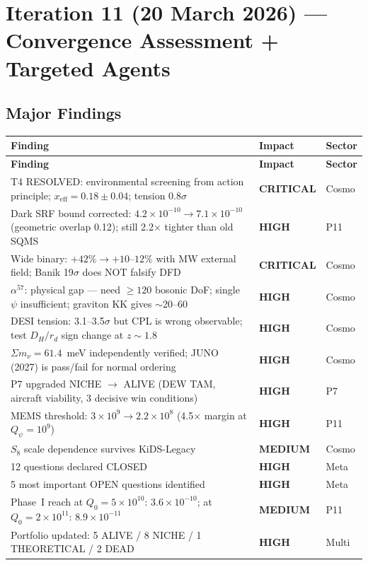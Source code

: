 \documentclass[11pt,a4paper]{article}
\newcommand{\CRITICAL}{\textcolor{critical}{\textbf{CRITICAL}}}
\newcommand{\HIGH}{\textcolor{high}{\textbf{HIGH}}}
\newcommand{\MEDIUM}{\textcolor{medium}{\textbf{MEDIUM}}}
\begin{document}
\section{Iteration 11 (20 March 2026) --- Convergence Assessment + Targeted Agents}

\subsection{Major Findings}

\begin{longtable}{p{}p{}p{}}
\toprule
\textbf{Finding} & \textbf{Impact} & \textbf{Sector} \\
\midrule
\endfirsthead
\midrule
\textbf{Finding} & \textbf{Impact} & \textbf{Sector} \\
\midrule
\endhead
T4 RESOLVED: environmental screening from action principle; $x_\mathrm{eff}=0.18\pm0.04$; tension 0.8$\sigma$ & \CRITICAL & Cosmo \\
Dark SRF bound corrected: $4.2\times10^{-10}\to7.1\times10^{-10}$ (geometric overlap 0.12); still 2.2$\times$ tighter than old SQMS & \HIGH & P11 \\
Wide binary: $+42\%\to+10$--$12\%$ with MW external field; Banik 19$\sigma$ does NOT falsify DFD & \CRITICAL & Cosmo \\
$\alpha^{57}$: physical gap --- need $\geq120$ bosonic DoF; single $\psi$ insufficient; graviton KK gives $\sim$20--60 & \HIGH & Cosmo \\
DESI tension: 3.1--3.5$\sigma$ but CPL is wrong observable; test $D_H/r_d$ sign change at $z\sim1.8$ & \HIGH & Cosmo \\
$\Sigma m_\nu = 61.4$~meV independently verified; JUNO (2027) is pass/fail for normal ordering & \HIGH & Cosmo \\
P7 upgraded NICHE $\to$ ALIVE (DEW TAM, aircraft viability, 3 decisive win conditions) & \HIGH & P7 \\
MEMS threshold: $3\times10^9\to2.2\times10^8$ (4.5$\times$ margin at $Q_\psi=10^9$) & \HIGH & P11 \\
$S_8$ scale dependence survives KiDS-Legacy & \MEDIUM & Cosmo \\
12 questions declared CLOSED & \HIGH & Meta \\
5 most important OPEN questions identified & \HIGH & Meta \\
Phase~I reach at $Q_0=5\times10^{10}$: $3.6\times10^{-10}$; at $Q_0=2\times10^{11}$: $8.9\times10^{-11}$ & \MEDIUM & P11 \\
Portfolio updated: 5 ALIVE / 8 NICHE / 1 THEORETICAL / 2 DEAD & \HIGH & Multi \\
\bottomrule
\end{longtable}
\end{document}
